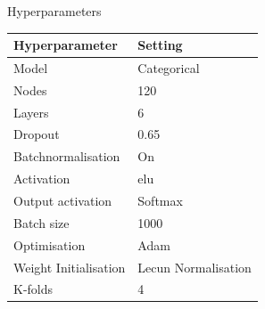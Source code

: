 \begin{frame}{Hyperparameters}
    \begin{table}[]
    \begin{tabular}{|l|l|}
    \hline
    Hyperparameter          &     Setting              \\ \hline
    Model                   &     Categorical          \\ \hline
    Nodes                   &     120                  \\ \hline
    Layers                  &     6                    \\ \hline
    Dropout                 &     0.65                 \\ \hline
    Batchnormalisation      &     On                   \\ \hline
    Activation              &     elu                  \\ \hline
    Output activation       &     Softmax              \\ \hline
    Batch size              &     1000                 \\ \hline
    Optimisation            &     Adam                 \\ \hline
    Weight Initialisation   &     Lecun Normalisation  \\ \hline
    K-folds                 &     4                    \\ \hline
    \end{tabular}
    \end{table}
\end{frame}

